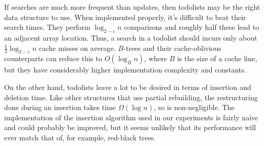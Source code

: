 \documentclass{patmorin}
\newcommand{\eps}{\varepsilon}
\begin{document}
If searches are much more frequent than updates, then todolists may be the
right data structure to use.  When implemented properly, it's difficult to
beat their search times.  They perform $\log_{2-\eps} n$ comparisons and
roughly half these lead to an adjacent array location. Thus, a search
in a todolist should incurs only about $\frac{1}{2}\log_{2-\eps} n$
cache misses on average.   $B$-trees \cite{X} and their cache-oblivious
counterparts \cite{X} can reduce this to $O(\log_B n)$, where $B$ is the
size of a cache line, but they have considerably higher implementation
complexity and constants.

On the other hand, todolists leave a lot to be desired in terms of
insertion and deletion time.  Like other structures that use partial
rebuilding, the restructuring done during an insertion takes time
$\Omega(\log n)$, so is non-negligible.  The implementation of the
insertion algorithm used in our experiments is fairly naïve and could
probably be improved, but it seems unlikely that its performance will
ever match that of, for example, red-black trees.





\end{document}
